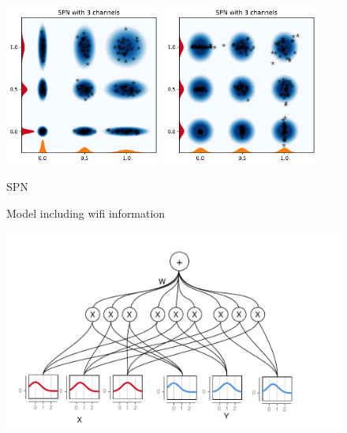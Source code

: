 \begin{figure}[H]%
    \centering
    {\includegraphics[width=0.46\textwidth]{Pictures/SPN_illustration1.pdf} }%
    \qquad
   {\includegraphics[width=0.46\textwidth]{Pictures/SPN_illustration2.pdf} }%
    \caption{SPN}%
    \label{SPN_fig}%
\end{figure}

\begin{figure}[htbp]
    \centering
    
    \caption{Model including wifi information}
    \label{fig:wifi2}
\end{figure}

\begin{figure}[H]
    \centering
    \includegraphics[width=\textwidth]{Figures/SPN_graph2.pdf}
\end{figure}